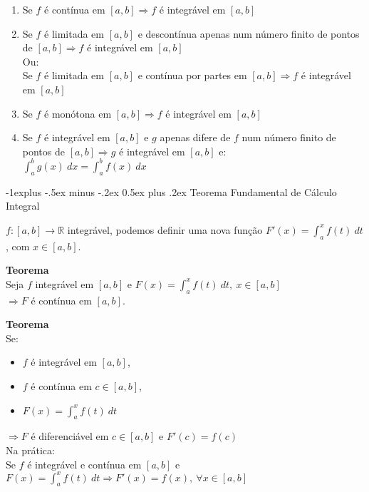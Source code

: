 \documentclass[10pt,landscape]{article}
\makeatletter
\newcommand{\RNum}[1]{\uppercase\expandafter{\romannumeral #1\relax}}
\renewcommand{\subsection}{\@startsection{subsection}{2}{0mm}%
                                {-1explus -.5ex minus -.2ex}%
                                {0.5ex plus .2ex}%
                                {\normalfont\normalsize\bfseries}}
\makeatother
\begin{document}
\begin{multicols}{3}
\begin{enumerate}
\item Se $f$ é contínua em $[a, b] \Rightarrow f$ é integrável em $[a, b]$
\item Se $f$ é limitada em $[a, b]$ e descontínua apenas num número finito de pontos de $[a, b] \Rightarrow f$ é integrável em $[a, b]$\\
Ou:\\
Se $f$ é limitada em $[a, b]$ e contínua por partes em $[a, b] \Rightarrow f$ é integrável em $[a, b]$
\item Se $f$ é monótona em $[a, b] \Rightarrow f$ é integrável em $[a, b]$
\item Se $f$ é integrável em $[a, b]$ e $g$ apenas difere de $f$ num número finito de pontos de $[a, b] \Rightarrow g$ é integrável em $[a, b]$ e:\\
$\int_a^b g(x)\ dx = \int_a^b f(x)\ dx$

\end{enumerate}

\subsection{Teorema Fundamental de Cálculo Integral}

$f: [a, b] \rightarrow \mathbb{R}$ integrável, podemos definir uma nova função $F'(x) = \int_a^x f(t)\ dt$, com $x \in [a, b]$.

\textbf{Teorema \RNum{1}}\\
Seja $f$ integrável em $[a, b]$ e $F(x) = \int_a^x f(t)\ dt,\ x \in [a, b]$\\
$\Longrightarrow F$ é contínua em $[a, b]$.

\textbf{Teorema \RNum{2}}\\
Se:

\begin{itemize}
\item $f$ é integrável em $[a, b]$,\\
\item $f$ é contínua em $c \in [a, b]$,\\
\item $F(x) = \int_a^x f(t)\ dt$
\end{itemize}

$\Longrightarrow F$ é diferenciável em $c \in [a, b]$ e $F'(c) = f(c)$\\

Na prática:\\
Se $f$ é integrável e contínua em $[a, b]$ e $F(x) = \int_a^x f(t)\ dt \Rightarrow F'(x) = f(x),\ \forall x \in [a, b]$\\


\end{multicols}
\end{document}

